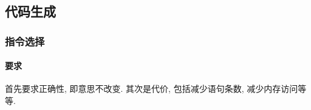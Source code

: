 \documentclass{ctexart}
\begin{document}
\subsection{代码生成}
\subsubsection{指令选择}
\paragraph{要求} 首先要求正确性, 即意思不改变.
    其次是代价, 包括减少语句条数, 减少内存访问等等.


\end{document}
